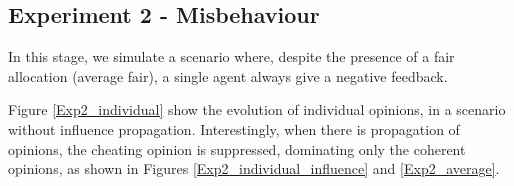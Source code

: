 \documentclass[conference,compsoc]{IEEEtran}
\begin{document}


\subsection{Experiment 2 - Misbehaviour}

In this stage, we simulate a scenario where, despite the presence of a fair allocation (average fair), a single agent always give a negative feedback.

Figure \ref{Exp2_individual} show the evolution of individual opinions, in a scenario without influence propagation. Interestingly, when there is propagation of opinions, the cheating opinion is suppressed, dominating only the coherent opinions, as shown in Figures \ref{Exp2_individual_influence} and \ref{Exp2_average}.




\end{document}
